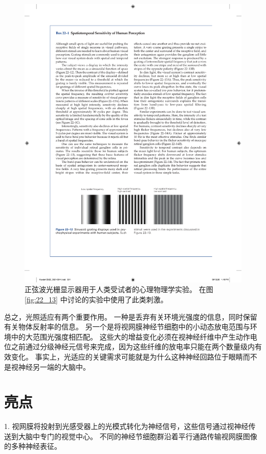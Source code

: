 \begin{figure}[htbp]
	\centering
	\includegraphics[width=1.0\linewidth]{chap22/fig_22_12}
	\caption{正弦波光栅显示器用于人类受试者的心理物理学实验。 
		在图 \ref{fig:22_13} 中讨论的实验中使用了此类刺激。}
	\label{fig:22_12}
\end{figure}


总之，光照适应有两个重要作用。
一种是丢弃有关环境光强度的信息，同时保留有关物体反射率的信息。
另一个是将视网膜神经节细胞中的小动态放电范围与环境中的大范围光强度相匹配。
这些大的增益变化必须在视神经纤维中产生动作电位之前通过分级神经元信号来完成，因为这些纤维的放电率只能在两个数量级内有效变化。
事实上，光适应的关键需求可能就是为什么这种神经回路位于眼睛而不是视神经另一端的大脑中。



\section{亮点}

1. 视网膜将投射到光感受器上的光模式转化为神经信号，这些信号通过视神经传送到大脑中专门的视觉中心。 
不同的神经节细胞群沿着平行通路传输视网膜图像的多种神经表征。


